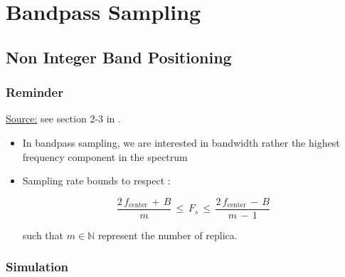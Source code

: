 

\chapter{Bandpass Sampling}

\section{Non Integer Band Positioning}

\subsection{Reminder}

\underline{Source:} see section 2-3 in \cite{book_understanding_dsp}.

\begin{itemize}
    \item In bandpass sampling, we are interested in bandwidth rather the highest frequency component in the spectrum
    
    \item Sampling rate bounds to respect \cite{book_understanding_dsp}:
    
    \begin{equation}
\displaystyle\frac{2 \, f_{\text{center}} \, + \, B}{m} \, \leq \, F_s \, \leq \, \displaystyle\frac{2 \, f_{\text{center}} \, - \, B}{m \, - \, 1}
\end{equation}

such that $m \in \mathbb{N}$ represent the number of replica.    
\end{itemize}

\subsection{Simulation}



